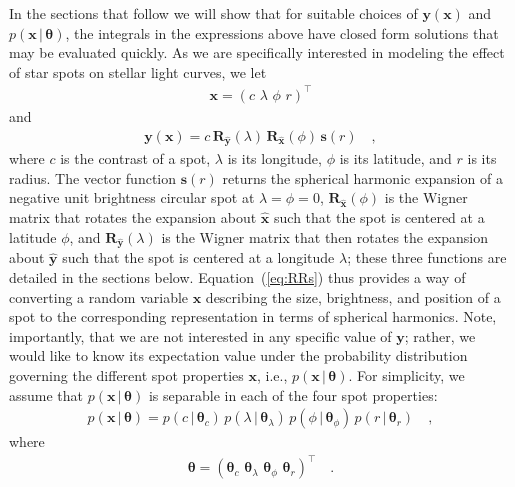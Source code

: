 \documentclass[modern]{aastex62}
\begin{document}
In the sections that follow we will show that for suitable choices of $\mathbf{y}(\mathbf{x})$
and $p(\mathbf{x} \, \big| \, \pmb{\theta})$, the integrals in the expressions
above have closed form solutions that may be evaluated quickly.
%
As we are specifically interested in modeling the effect of star spots
on stellar light curves, we let
%
\begin{align}
    \mathbf{x} = \left( c \,\, \lambda \,\, \phi \,\, r \right)^\top
\end{align}
%
and
%
\begin{align}
    \label{eq:RRs}
    \mathbf{y}(\mathbf{x}) =
    c
    \,
    \mathbf{R}_{\hat{\mathbf{y}}}(\lambda)
    \,
    \mathbf{R}_{\hat{\mathbf{x}}}(\phi)
    \,
    \mathbf{s}(r)
    \quad,
\end{align}
%
where $c$ is the contrast of a spot,
$\lambda$ is its longitude, $\phi$ is its latitude,
and $r$ is its radius.
The vector function $\mathbf{s}(r)$
returns the spherical harmonic expansion of a negative unit brightness
circular spot at $\lambda = \phi = 0$,
$\mathbf{R}_{\hat{\mathbf{x}}}(\phi)$ is the Wigner matrix that rotates the
expansion about $\hat{\mathbf{x}}$ such that the spot is centered at a
latitude $\phi$, and $\mathbf{R}_{\hat{\mathbf{y}}}(\lambda)$ is the Wigner
matrix that then rotates the
expansion about $\hat{\mathbf{y}}$ such that the spot is centered at a
longitude $\lambda$; these three functions are detailed in the sections below.
%
Equation~(\ref{eq:RRs}) thus provides a way of converting a random variable
$\mathbf{x}$ describing the size, brightness, and position of a spot to the
corresponding representation in terms of spherical harmonics.
%
Note, importantly, that we are not interested in any specific value of
$\mathbf{y}$; rather, we would like to know its expectation value under
the probability distribution governing the different spot properties $\mathbf{x}$,
i.e., $p(\mathbf{x} \, \big| \, \pmb{\theta})$.
%
For simplicity, we assume that $p(\mathbf{x} \, \big| \, \pmb{\theta})$
is separable in each of the four spot properties:
%
\begin{align}
    p(\mathbf{x} \, \big| \, \pmb{\theta})
    =
    p(c \, \big| \, \pmb{\theta}_{c}) \,
    p(\lambda \, \big| \, \pmb{\theta}_{\lambda}) \,
    p(\phi \, \big| \, \pmb{\theta}_{\phi})\,
    p(r \, \big| \, \pmb{\theta}_{r})
    \quad,
\end{align}
%
where
%
\begin{align}
    \pmb{\theta} = \left(
    \pmb{\theta}_{c} \, \,
    \pmb{\theta}_{\lambda} \, \,
    \pmb{\theta}_{\phi} \, \,
    \pmb{\theta}_{r} \right)^\top
    \quad.
\end{align}
\end{document}
